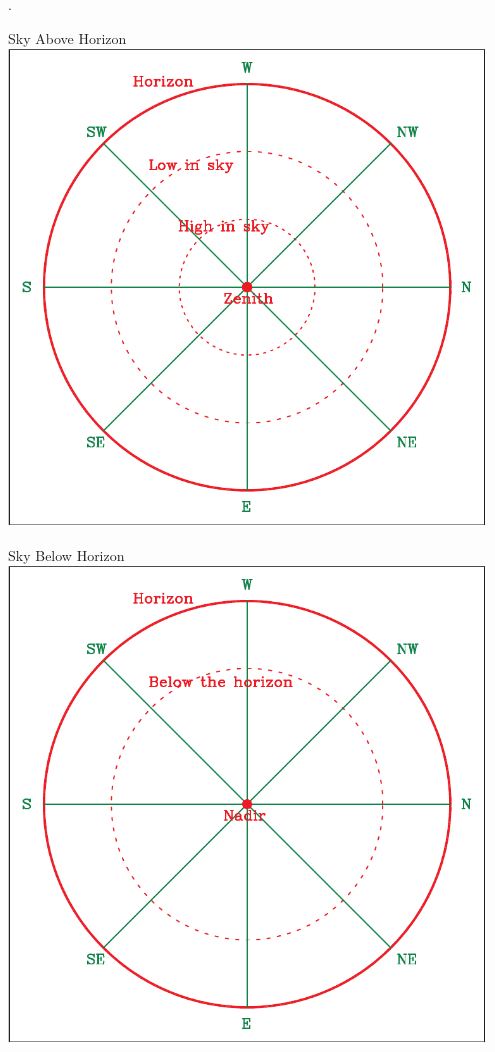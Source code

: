 \documentclass[12pt]{article}
\begin{document}
	
.
\vspace{0.7in}

	
\begin{minipage}{0.5\textwidth}
	\begin{center}
		\large Sky Above Horizon\\
		\includegraphics[width=0.95\textwidth]{topsky-crop.pdf}
	\end{center}
\end{minipage}
\begin{minipage}{0.5\textwidth}
	\begin{center}
		\large Sky Below Horizon\\
		\includegraphics[width=0.95\textwidth]{botsky-crop.pdf}
	\end{center}
\end{minipage}
\end{document}
